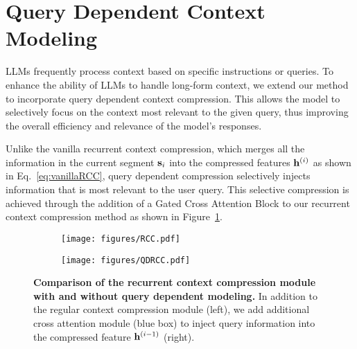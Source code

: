 \section{Query Dependent Context Modeling}
LLMs frequently process context based on specific instructions or queries. To enhance the ability of LLMs to handle long-form context, we extend our method to incorporate query dependent context compression. This allows the model to selectively focus on the context most relevant to the given query, thus improving the overall efficiency and relevance of the model's responses.

Unlike the vanilla recurrent context compression, which merges all the information in the current segment $\mathbf{s}_i$ into the compressed features $\mathbf{h}^{(i)}$ as shown in Eq.~\eqref{eq:vanillaRCC}, query dependent compression selectively injects information that is most relevant to the user query. This selective compression is achieved through the addition of a Gated Cross Attention Block to our recurrent context compression method as shown in Figure~\ref{fig:QDRCC}.

\begin{figure}[t]
    \centering  
    \begin{subfigure}{.47\linewidth}
        \centering
        \texttt{[image: figures/RCC.pdf]}
    \end{subfigure}\hspace{0.3cm}
    \begin{subfigure}{.47\linewidth}
        \centering
        \texttt{[image: figures/QDRCC.pdf]}
    \end{subfigure}
    \caption{\textbf{Comparison of the recurrent context compression module with and without query dependent modeling.} 
    In addition to the regular context compression module (left), we add additional cross attention module (blue box) to inject query information into the compressed feature $\mathbf{h}^{(i-1)}$ (right).}
    \label{fig:QDRCC}
\end{figure}

